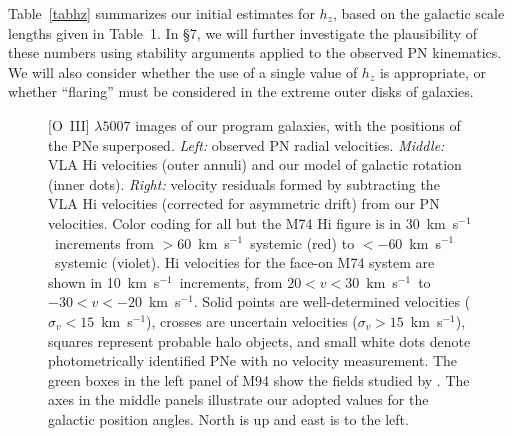 \documentclass[12pt,preprint]{emulateapj}
\newcommand{\kms}{km~s$^{-1}$}
\begin{document}
Table~\ref{tabhz} summarizes our initial estimates for $h_z$, based on the galactic scale lengths given in Table~1.  In \S7, we will further investigate the plausibility of these numbers using stability arguments applied to the observed PN kinematics.  We will also consider whether the use of a single value of $h_z$ is appropriate, or whether ``flaring'' must be considered in the extreme outer disks of galaxies.

\begin{figure}
\caption{\scriptsize [O~III] $\lambda 5007$ images of our program galaxies, with the positions of the PNe superposed.  {\it Left:} observed PN radial velocities. {\it Middle:} VLA H{\sc i} velocities (outer annuli) and our model of galactic rotation (inner dots). {\it Right:} velocity residuals formed by subtracting the VLA H{\sc i} velocities (corrected for asymmetric drift) from our PN velocities.  Color coding for all but the M74 H{\sc i} figure is in 30~\kms\ increments from $> 60$~\kms\ systemic (red) to $< - 60$~\kms\ systemic (violet).  H{\sc i} velocities for the face-on M74 system are shown in 10~\kms\ increments, from $20 < v < 30$~\kms\ to $-30 < v < -20$~\kms.  Solid points are well-determined velocities ($\sigma_v < 15$~\kms), crosses are uncertain velocities ($\sigma_v > 15$~\kms), squares represent probable halo objects, and small white dots denote photometrically identified PNe with no velocity measurement.   The green boxes in the left panel of M94 show the fields studied by \citet{M94PNS}.  The axes in the middle panels illustrate our adopted values for the galactic position angles.  North is up and east is to the left.  \label{onbands} }
\end{figure}
\end{document}
